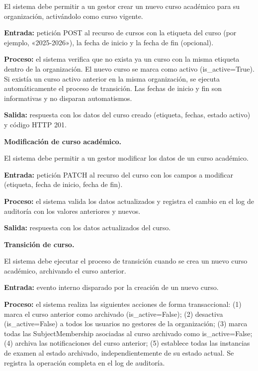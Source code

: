 \begin{functional}
\begin{functional}
    El sistema debe permitir a un gestor crear un nuevo curso académico para su organización, activándolo como curso vigente.

    \textbf{Entrada:} petición POST al recurso de cursos con la etiqueta del curso (por ejemplo, «2025-2026»), la fecha de inicio y la fecha de fin (opcional).

    \textbf{Proceso:} el sistema verifica que no exista ya un curso con la misma etiqueta dentro de la organización. El nuevo curso se marca como activo (is\_active=True). Si existía un curso activo anterior en la misma organización, se ejecuta automáticamente el proceso de transición. Las fechas de inicio y fin son informativas y no disparan automatismos.

    \textbf{Salida:} respuesta con los datos del curso creado (etiqueta, fechas, estado activo) y código HTTP 201.

    \item \textbf{Modificación de curso académico.}

    El sistema debe permitir a un gestor modificar los datos de un curso académico.

    \textbf{Entrada:} petición PATCH al recurso del curso con los campos a modificar (etiqueta, fecha de inicio, fecha de fin).

    \textbf{Proceso:} el sistema valida los datos actualizados y registra el cambio en el log de auditoría con los valores anteriores y nuevos.

    \textbf{Salida:} respuesta con los datos actualizados del curso.

    \item \textbf{Transición de curso.}

    El sistema debe ejecutar el proceso de transición cuando se crea un nuevo curso académico, archivando el curso anterior.

    \textbf{Entrada:} evento interno disparado por la creación de un nuevo curso.

    \textbf{Proceso:} el sistema realiza las siguientes acciones de forma transaccional: (1) marca el curso anterior como archivado (is\_active=False); (2) desactiva (is\_active=False) a todos los usuarios no gestores de la organización; (3) marca todas las SubjectMembership asociadas al curso archivado como is\_active=False; (4) archiva las notificaciones del curso anterior; (5) establece todas las instancias de examen al estado archivado, independientemente de su estado actual. Se registra la operación completa en el log de auditoría.


\end{functional}
\end{functional}
